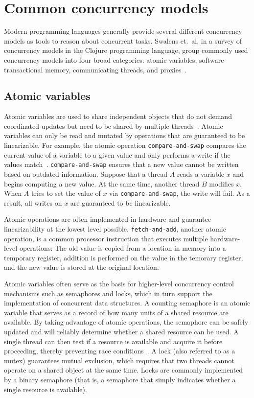 \documentclass{sig-alternate}
\newcommand{\code}[1]{\texttt{#1}}
\begin{document}
\section{Common concurrency models}

Modern programming languages generally provide several different concurrency models as tools to reason about concurrent tasks. Swalens et.\ al, in a survey of concurrency models in the Clojure programming language, group commonly used concurrency models into four broad categories: atomic variables, software transactional memory, communicating threads, and proxies~\cite{Swalens2014}.

\subsection{Atomic variables}

Atomic variables are used to share independent objects that do not demand coordinated updates but need to be shared by multiple threads~\cite{Swalens2014}. Atomic variables can only be read and mutated by operations that are guaranteed to be linearizable. For example, the atomic operation \code{compare-and-swap} compares the current value of a variable to a given value and only performs a write if the values match~\cite{Swalens2014}. \code{compare-and-swap} ensures that a new value cannot be written based on outdated information. Suppose that a thread $A$ reads a variable $x$ and begins computing a new value. At the same time, another thread $B$ modifies $x$. When $A$ tries to set the value of $x$ via \code{compare-and-swap}, the write will fail. As a result, all writes on $x$ are guaranteed to be linearizable.

Atomic operations are often implemented in hardware and guarantee linearizability at the lowest level possible. \code{fetch-and-add}, another atomic operation, is a common processor instruction that executes multiple hardware-level operations: The old value is copied from a location in memory into a temporary register, addition is performed on the value in the temorary register, and the new value is stored at the original location.

Atomic variables often serve as the basis for higher-level concurrency control mechanisms such as semaphores and locks, which in turn support the implementation of concurrent data structures. A counting semaphore is an atomic variable that serves as a record of how many units of a shared resource are available. By taking advantage of atomic operations, the semaphore can be safely updated and will reliably determine whether a shared resource can be used. A single thread can then test if a resource is available and acquire it before proceeding, thereby preventing race conditions~\cite{Swalens2014}. A lock (also referred to as a mutex) guarantees mutual exclusion, which requires that two threads cannot operate on a shared object at the same time. Locks are commonly implemented by a binary semaphore (that is, a semaphore that simply indicates whether a single resource is available).
\end{document}
